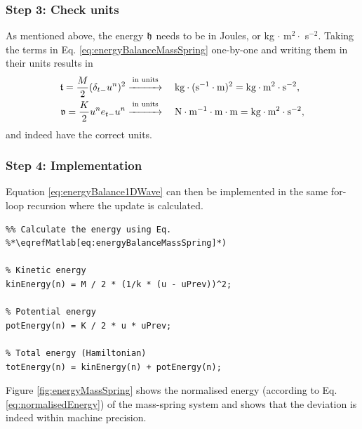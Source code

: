 {{\subsubsection{Step 3: Check units}
As mentioned above, the energy $\mathfrak{h}$ needs to be in Joules, or kg $\cdot$ m$^2 \cdot$ s$^{-2}$. Taking the terms in Eq. \eqref{eq:energyBalanceMassSpring} one-by-one and writing them in their units results in 
\begin{align*}
    \mathfrak{t} = \frac{M}{2}(\delta_{t-}u^n)^2 &\overset{\text{in units}}{\xrightarrow{\hspace*{1cm}}} \quad\text{kg}\cdot(\text{s}^{-1}\cdot \text{m})^{2}= \text{kg}\cdot\text{m}^2\cdot\text{s}^{-2},\\
    \mathfrak{v} = \frac{K}{2}u^n e_{t-}u^n&\overset{\text{in units}}{\xrightarrow{\hspace*{1cm}}} \quad \text{N} \cdot \text{m}^{-1} \cdot \text{m}\cdot \text{m} = \text{kg}\cdot\text{m}^2\cdot\text{s}^{-2},
\end{align*}
and indeed have the correct units. 

\subsubsection{Step 4: Implementation}
Equation \eqref{eq:energyBalance1DWave} can then be implemented in the same for-loop recursion where the update is calculated.  
\setlstMAT
\begin{lstlisting}
%% Calculate the energy using Eq. %*\eqrefMatlab[eq:energyBalanceMassSpring]*) 

% Kinetic energy
kinEnergy(n) = M / 2 * (1/k * (u - uPrev))^2;

% Potential energy
potEnergy(n) = K / 2 * u * uPrev;

% Total energy (Hamiltonian)
totEnergy(n) = kinEnergy(n) + potEnergy(n);
\end{lstlisting}
Figure \ref{fig:energyMassSpring} shows the normalised energy (according to Eq. \eqref{eq:normalisedEnergy}) of the mass-spring system and shows that the deviation is indeed within machine precision. 

\begin{figure}[h]
    \centering
\end{figure}}}
